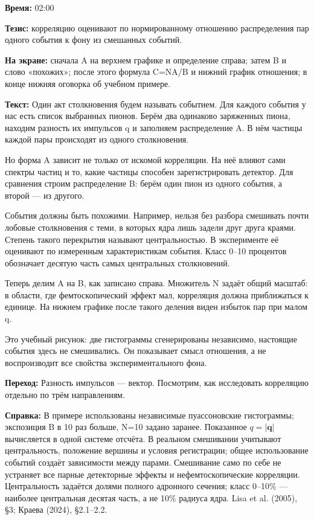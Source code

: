 \textbf{Время:} 02:00

\textbf{Тезис:} корреляцию оценивают по нормированному отношению распределения пар одного события к фону из смешанных событий.

\textbf{На экране:} сначала A на верхнем графике и определение справа; затем B и слово «похожих»; после этого формула C=NA/B и нижний график отношения; в конце нижняя оговорка об учебном примере.

\textbf{Текст:} Один акт столкновения будем называть событием. Для каждого события у нас есть список выбранных пионов. Берём два одинаково заряженных пиона, находим разность их импульсов q и заполняем распределение A. В нём частицы каждой пары происходят из одного столкновения.

Но форма A зависит не только от искомой корреляции. На неё влияют сами спектры частиц и то, какие частицы способен зарегистрировать детектор. Для сравнения строим распределение B: берём один пион из одного события, а второй — из другого.

События должны быть похожими. Например, нельзя без разбора смешивать почти лобовые столкновения с теми, в которых ядра лишь задели друг друга краями. Степень такого перекрытия называют центральностью. В эксперименте её оценивают по измеренным характеристикам события. Класс 0–10 процентов обозначает десятую часть самых центральных столкновений.

Теперь делим A на B, как записано справа. Множитель N задаёт общий масштаб: в области, где фемтоскопический эффект мал, корреляция должна приближаться к единице. На нижнем графике после такого деления виден избыток пар при малом q.

Это учебный рисунок: две гистограммы сгенерированы независимо, настоящие события здесь не смешивались. Он показывает смысл отношения, а не воспроизводит все свойства экспериментального фона.

\textbf{Переход:} Разность импульсов — вектор. Посмотрим, как исследовать корреляцию отдельно по трём направлениям.

\textbf{Справка:} В примере использованы независимые пуассоновские гистограммы; экспозиция B в 10 раз больше, N=10 задано заранее. Показанное \(q=|\mathbf q|\) вычисляется в одной системе отсчёта. В реальном смешивании учитывают центральность, положение вершины и условия регистрации; общее использование событий создаёт зависимости между парами. Смешивание само по себе не устраняет все парные детекторные эффекты и нефемтоскопические корреляции. Центральность задаётся долями полного адронного сечения; класс 0–10\% — наиболее центральная десятая часть, а не 10\% радиуса ядра. Lisa et al. (2005), §3; Краева (2024), §2.1–2.2.
